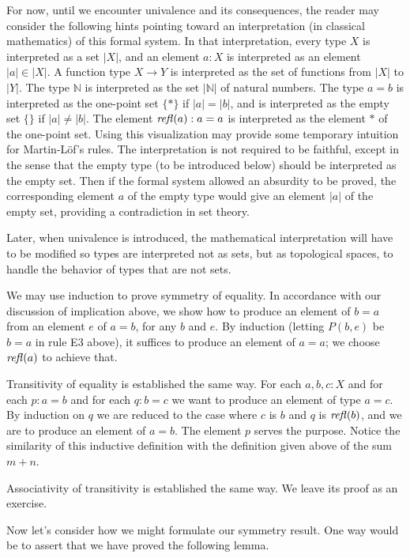\documentclass[letter,12pt]{amsart}
\theoremstyle{definition}
\theoremstyle{remark}
\numberwithin{equation}{section}
\newcommand{\refl}{\mathop{{\it refl}}}
\newcommand{\NN}{\mathbb{N}}
\begin{document}
For now, until we encounter univalence and its consequences, the reader may consider the following hints pointing toward an interpretation (in
classical mathematics) of this formal system.  In that interpretation, every type $X$ is interpreted as a set $|X|$, and an element $a:X$ is interpreted as
an element $|a| \in |X|$.  A function type $X \to Y$ is interpreted as the set of functions from $|X|$ to $|Y|$.  The type $\NN$ is interpreted
as the set $|\NN|$ of natural numbers.  The type $a=b$ is interpreted as the one-point set $\{*\}$ if $|a| = |b|$, and is interpreted as the
empty set $\{\}$ if $|a| \ne |b|$.  The element $\refl(a) : a=a$ is interpreted as the element $*$ of the one-point set.  Using this
visualization may provide some temporary intuition for Martin-L\"of's rules.  The interpretation is not required to be faithful, except in the
sense that the empty type (to be introduced below) should be interpreted as the empty set.  Then if the formal system allowed an absurdity to be
proved, the corresponding element $a$ of the empty type would give an element $|a|$ of the empty set, providing a contradiction in set theory.

Later, when univalence is introduced, the mathematical interpretation will have to be modified so types are interpreted not as sets, but as
topological spaces, to handle the behavior of types that are not sets.

We may use induction to prove symmetry of equality.  In accordance with our discussion of implication above, we show how to produce an
element of $b=a$ from an element $e$ of $a=b$, for any $b$ and $e$.  By induction (letting $P(b,e)$ be $b=a$ in rule E3 above), it suffices to produce an element of
$a=a$; we choose $\refl(a)$ to achieve that.

Transitivity of equality is established the same way.  For each $a,b,c:X$ and for each $p:a=b$ and for each $q:b=c$ we want to produce an
element of type $a=c$.  By induction on $q$ we are reduced to the case where $c$ is $b$ and $q$ is $\refl(b)$, and we are to produce an element
of $a=b$.  The element $p$ serves the purpose.  Notice the similarity of this inductive definition with the definition given above of the sum
$m+n$.

Associativity of transitivity is established the same way.  We leave its proof as an exercise.

Now let's consider how we might formulate our symmetry result.  One way would be to assert that we have proved the following lemma.
\end{document}

